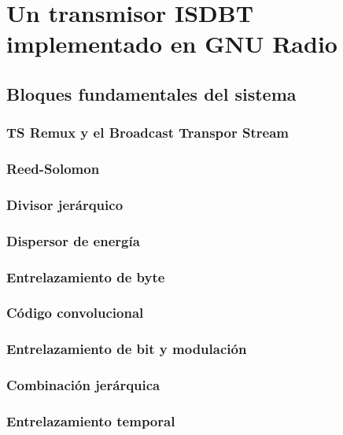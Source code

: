 \chapter{Un transmisor ISDBT implementado en GNU Radio}

\section{Bloques fundamentales del sistema}

\subsection{TS Remux y el Broadcast Transpor Stream}

\subsection{Reed-Solomon}

\subsection{Divisor jerárquico}

\subsection{Dispersor de energía}

\subsection{Entrelazamiento de byte}

\subsection{Código convolucional}

\subsection{Entrelazamiento de bit y modulación}

\subsection{Combinación jerárquica}

\subsection{Entrelazamiento temporal}

